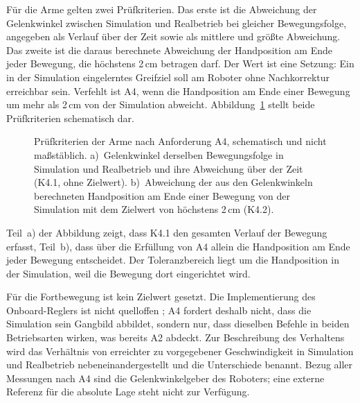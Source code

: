 Für die Arme gelten zwei Prüfkriterien.
Das erste ist die Abweichung der Gelenkwinkel zwischen Simulation und Realbetrieb bei gleicher Bewegungsfolge, angegeben als Verlauf über der Zeit sowie als mittlere und größte Abweichung. %
Das zweite ist die daraus berechnete Abweichung der Handposition am Ende jeder Bewegung, die höchstens 2\,cm betragen darf. %
Der Wert ist eine Setzung: Ein in der Simulation eingelerntes Greifziel soll am Roboter ohne Nachkorrektur erreichbar sein.
Verfehlt ist A4, wenn die Handposition am Ende einer Bewegung um mehr als 2\,cm von der Simulation abweicht.
Abbildung~\ref{fig:handtoleranz} stellt beide Prüfkriterien schematisch dar.

\begin{figure}[htbp]
  \centering
  
  \caption[Prüfkriterien der Arme nach Anforderung A4]{Prüfkriterien der Arme nach Anforderung A4, schematisch und nicht maßstäblich. a)~Gelenkwinkel derselben Bewegungsfolge in Simulation und Realbetrieb und ihre Abweichung über der Zeit (K4.1, ohne Zielwert). b)~Abweichung der aus den Gelenkwinkeln berechneten Handposition am Ende einer Bewegung von der Simulation mit dem Zielwert von höchstens 2\,cm (K4.2).}
  \label{fig:handtoleranz}
\end{figure}

Teil~a) der Abbildung zeigt, dass K4.1 den gesamten Verlauf der Bewegung erfasst, Teil~b), dass über die Erfüllung von A4 allein die Handposition am Ende jeder Bewegung entscheidet.
Der Toleranzbereich liegt um die Handposition in der Simulation, weil die Bewegung dort eingerichtet wird.

Für die Fortbewegung ist kein Zielwert gesetzt.
Die Implementierung des Onboard-Reglers ist nicht quelloffen \cite{Hu2026}; A4 fordert deshalb nicht, dass die Simulation sein Gangbild abbildet, sondern nur, dass dieselben Befehle in beiden Betriebsarten wirken, was bereits A2 abdeckt.
Zur Beschreibung des Verhaltens wird das Verhältnis von erreichter zu vorgegebener Geschwindigkeit in Simulation und Realbetrieb nebeneinandergestellt und die Unterschiede benannt. %
Bezug aller Messungen nach A4 sind die Gelenkwinkelgeber des Roboters; eine externe Referenz für die absolute Lage steht nicht zur Verfügung.

